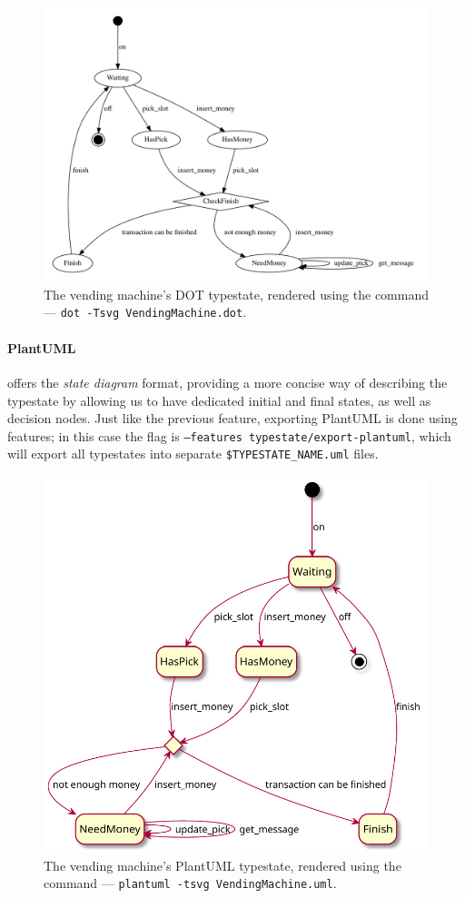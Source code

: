 \begin{figure}
    \centering
    \includegraphics[width=\linewidth]{Chapters/Figures/C4/VendingMachine.dot.pdf}
    \caption{The vending machine's DOT typestate, rendered using the command --- \texttt{dot -Tsvg VendingMachine.dot}.}
    \label{fig:vending-machine-typestate-dot}
\end{figure}

\paragraph{PlantUML} offers the \emph{state diagram} format, providing a more concise way of describing the typestate
by allowing us to have dedicated initial and final states, as well as decision nodes.
Just like the previous feature, exporting PlantUML is done using features;
in this case the flag is \texttt{--features typestate/export-plantuml},
which will export all typestates into separate \texttt{\$TYPESTATE\_NAME.uml} files.


\begin{figure}
    \centering
    \includegraphics[width=0.7\linewidth]{Chapters/Figures/C4/VendingMachine.uml.pdf}
    \caption{The vending machine's PlantUML typestate, rendered using the command --- \texttt{plantuml -tsvg VendingMachine.uml}.}
    \label{fig:vending-machine-typestate-uml}
\end{figure}

